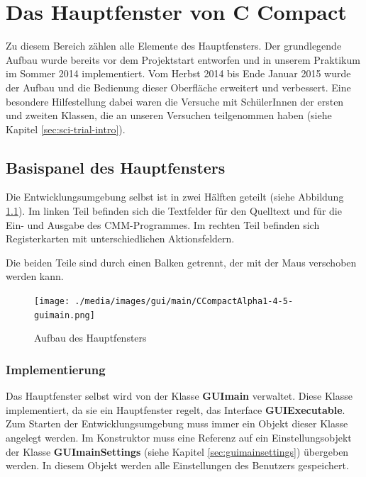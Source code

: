 



\chapter{Das Hauptfenster von C Compact}
\label{sec:gui-main}
Zu diesem Bereich zählen alle Elemente des Hauptfensters. Der grundlegende Aufbau wurde bereits vor dem Projektstart entworfen und in unserem Praktikum im Sommer 2014 implementiert. Vom Herbst 2014 bis Ende Januar 2015 wurde der Aufbau und die Bedienung dieser Oberfläche erweitert und verbessert. Eine besondere Hilfestellung dabei waren die Versuche mit SchülerInnen der ersten und zweiten Klassen, die an unseren Versuchen teilgenommen haben (siehe Kapitel \ref{sec:sci-trial-intro}).

\section{Basispanel des Hauptfensters}
Die Entwicklungsumgebung selbst ist in zwei Hälften geteilt (siehe Abbildung \ref{fig:gui-main-1}). Im linken Teil befinden sich die Textfelder für den Quelltext und für die Ein- und Ausgabe des CMM-Programmes. Im rechten Teil befinden sich Registerkarten mit unterschiedlichen Aktionsfeldern.

Die beiden Teile sind durch einen Balken getrennt, der mit der Maus verschoben werden kann.%

\begin{figure}[h] 
  \centering
     \texttt{[image: ./media/images/gui/main/CCompactAlpha1-4-5-guimain.png]}
  \caption{Aufbau des Hauptfensters}
  \label{fig:gui-main-1}
\end{figure}

\subsection{Implementierung}
\label{sec:gui-main-impl}
Das Hauptfenster selbst wird von der Klasse \textbf{GUImain} verwaltet. Diese Klasse implementiert, da sie ein Hauptfenster regelt, das Interface \textbf{GUIExecutable}. Zum Starten der Entwicklungsumgebung muss immer ein Objekt dieser Klasse angelegt werden. Im Konstruktor muss eine Referenz auf ein Einstellungsobjekt der Klasse \textbf{GUImainSettings} (siehe Kapitel \ref{sec:guimainsettings}) übergeben werden. In diesem Objekt werden alle Einstellungen des Benutzers gespeichert.


